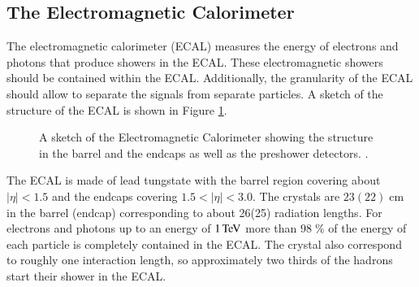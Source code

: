 \subsection{The Electromagnetic Calorimeter}

The electromagnetic calorimeter (ECAL)\cite{Bayatian:922757} measures the energy of electrons and photons that produce showers in the ECAL.
These electromagnetic showers should be contained within the ECAL. Additionally, the granularity of the ECAL should allow to separate the signals from separate particles.
A sketch of the structure of the ECAL is shown in Figure \ref{fig:det_ECAL}.

\begin{figure}[htbp!]
  \begin{center}

\caption{A sketch of the Electromagnetic Calorimeter showing the structure in the barrel and the endcaps as well as the preshower detectors. \cite{Chatrchyan:2009qm}.
  \label{fig:det_ECAL}}
  \end{center}
\end{figure}

The ECAL is made of lead tungstate with the barrel region covering about $|\eta| < 1.5$ and the endcaps covering $1.5 < |\eta|<3.0$. The crystals are $23 (22) \; \si{\centi \meter}$ in the barrel (endcap) corresponding to about 26(25) radiation lengths.
For electrons and photons up to an energy of $1 \,\text{Te\hspace{-.08em}V}$ more than $98 \; \%$ of the energy of each particle is completely contained in the ECAL.
The crystal also correspond to roughly one interaction length, so approximately two thirds of the hadrons start their shower in the ECAL.

